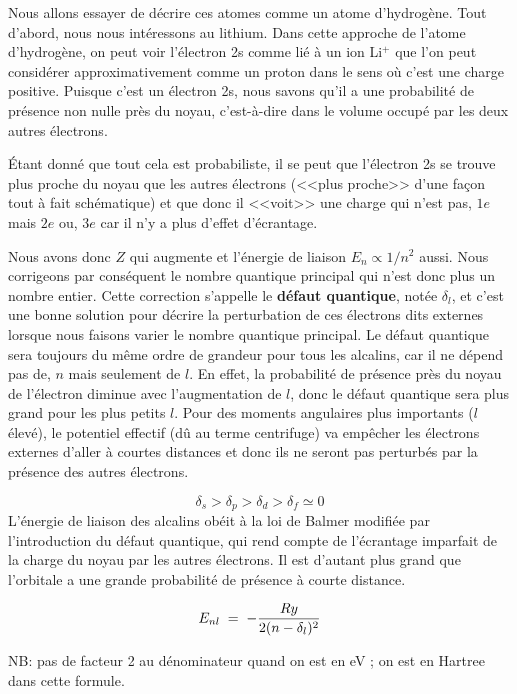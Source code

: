 Nous allons essayer de décrire ces atomes comme un atome d'hydrogène. Tout d'abord, nous nous intéressons au lithium. Dans cette approche de l'atome d'hydrogène, on peut voir l'électron 2s comme lié à un ion Li$^{+}$ que l'on peut considérer approximativement comme un proton dans le sens où c'est une charge positive. Puisque c'est un électron 2s, nous savons qu'il a une probabilité de présence non nulle près du noyau, c'est-à-dire dans le volume occupé par les deux autres électrons.


Étant donné que tout cela est probabiliste, il se peut que l'électron 2s se trouve plus proche du noyau que les autres électrons (<<plus proche>> d'une façon tout à fait schématique) et que donc il <<voit>> une charge qui n'est pas, $1e$ mais $2e$ ou, $3e$ car il n'y a plus d'effet d'écrantage.

Nous avons donc $Z$ qui augmente et l'énergie de liaison $E_n \propto 1/n^2$ aussi. Nous corrigeons par conséquent le nombre quantique principal qui n'est donc plus un nombre entier. Cette correction s’appelle le \textbf{défaut quantique}, notée $\delta_l$, et c’est une bonne solution pour décrire la perturbation de ces électrons dits externes lorsque nous faisons varier le nombre quantique principal.
Le défaut quantique sera toujours du même ordre de grandeur pour tous les alcalins, car il ne dépend pas de, $n$ mais seulement de $l$. En effet, la probabilité de présence près du noyau de l'électron diminue avec l'augmentation de $l$, donc le défaut quantique sera plus grand pour les plus petits $l$. Pour des moments angulaires plus importants ($l$ élevé), le potentiel effectif (dû au terme centrifuge) va empêcher les électrons externes d’aller à courtes distances et donc ils ne seront pas perturbés par la présence des autres électrons.

\[
    \delta_s>\delta_p>\delta_d>\delta_f\simeq 0
\]
L'énergie de liaison des alcalins obéit à la loi de Balmer modifiée par l’introduction du défaut quantique, qui rend compte de l’écrantage imparfait de la charge du noyau par les autres électrons. Il est d’autant plus grand que l’orbitale a une grande probabilité de présence à courte distance.

\begin{equation}
    E_{nl} \; = \;  - \dfrac{Ry}{2(n-\delta_l)^2}
    \label{eq:def_quant}
\end{equation}

NB: pas de facteur 2 au dénominateur quand on est en eV ; on est en Hartree dans cette formule.


